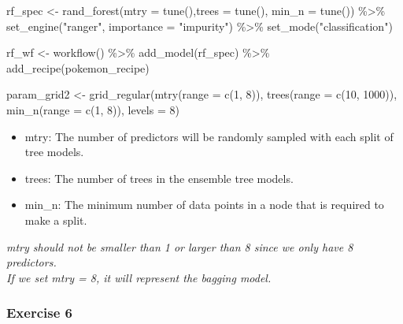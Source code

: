 \documentclass[
]{article}
\newenvironment{Shaded}{\begin{snugshade}}{\end{snugshade}}
\newcommand{\AttributeTok}[1]{\textcolor[rgb]{0.77,0.63,0.00}{#1}}
\newcommand{\DecValTok}[1]{\textcolor[rgb]{0.00,0.00,0.81}{#1}}
\newcommand{\FunctionTok}[1]{\textcolor[rgb]{0.00,0.00,0.00}{#1}}
\newcommand{\NormalTok}[1]{#1}
\newcommand{\OtherTok}[1]{\textcolor[rgb]{0.56,0.35,0.01}{#1}}
\newcommand{\SpecialCharTok}[1]{\textcolor[rgb]{0.00,0.00,0.00}{#1}}
\newcommand{\StringTok}[1]{\textcolor[rgb]{0.31,0.60,0.02}{#1}}
\providecommand{\tightlist}{%
  \setlength{\itemsep}{0pt}\setlength{\parskip}{0pt}}
\begin{document}
\begin{Shaded}
\begin{Highlighting}[]
\NormalTok{rf\_spec }\OtherTok{\textless{}{-}} \FunctionTok{rand\_forest}\NormalTok{(}\AttributeTok{mtry =} \FunctionTok{tune}\NormalTok{(),}\AttributeTok{trees =} \FunctionTok{tune}\NormalTok{(), }\AttributeTok{min\_n =} \FunctionTok{tune}\NormalTok{()) }\SpecialCharTok{\%\textgreater{}\%}
  \FunctionTok{set\_engine}\NormalTok{(}\StringTok{"ranger"}\NormalTok{, }\AttributeTok{importance =} \StringTok{"impurity"}\NormalTok{) }\SpecialCharTok{\%\textgreater{}\%}
  \FunctionTok{set\_mode}\NormalTok{(}\StringTok{"classification"}\NormalTok{)}

\NormalTok{rf\_wf }\OtherTok{\textless{}{-}} \FunctionTok{workflow}\NormalTok{() }\SpecialCharTok{\%\textgreater{}\%}
  \FunctionTok{add\_model}\NormalTok{(rf\_spec) }\SpecialCharTok{\%\textgreater{}\%} 
  \FunctionTok{add\_recipe}\NormalTok{(pokemon\_recipe)}

\NormalTok{param\_grid2 }\OtherTok{\textless{}{-}} \FunctionTok{grid\_regular}\NormalTok{(}\FunctionTok{mtry}\NormalTok{(}\AttributeTok{range =} \FunctionTok{c}\NormalTok{(}\DecValTok{1}\NormalTok{, }\DecValTok{8}\NormalTok{)),}
                           \FunctionTok{trees}\NormalTok{(}\AttributeTok{range =} \FunctionTok{c}\NormalTok{(}\DecValTok{10}\NormalTok{, }\DecValTok{1000}\NormalTok{)),}
                           \FunctionTok{min\_n}\NormalTok{(}\AttributeTok{range =} \FunctionTok{c}\NormalTok{(}\DecValTok{1}\NormalTok{, }\DecValTok{8}\NormalTok{)),}
                           \AttributeTok{levels =} \DecValTok{8}\NormalTok{)}
\end{Highlighting}
\end{Shaded}

\begin{itemize}
\tightlist
\item
  mtry: The number of predictors will be randomly sampled with each
  split of tree models.
\item
  trees: The number of trees in the ensemble tree models.
\item
  min\_n: The minimum number of data points in a node that is required
  to make a split.
\end{itemize}

\emph{mtry should not be smaller than 1 or larger than 8 since we only
have 8 predictors.}\\
\emph{If we set mtry = 8, it will represent the bagging model.}

\hypertarget{exercise-6}{%
\subsubsection{Exercise 6}\label{exercise-6}}
\end{document}
